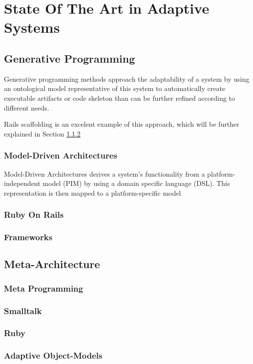 \chapter{State Of The Art in Adaptive Systems}\label{chap:sota}

\section{Generative Programming}\label{sec:generative_programming}

Generative programming methods approach the adaptability of a system by using an ontological model representative of this system to automatically create executable artifacts or code skeleton than can be further refined according to different needs.

Rails scaffolding is an excelent example of this approach, which will be further explained in Section \ref{sec:ror}

\subsection{Model-Driven Architectures}\label{sec:mda}

Model-Driven Architectures derives a system's functionality from a platform-independent model (PIM) by using a domain specific language (DSL). This representation is then mapped to a platform-specific model

\subsection{Ruby On Rails}\label{sec:ror}

\subsection{Frameworks}\label{sec:frameworks}


\section{Meta-Architecture}\label{sec:meta-architecture}

\subsection{Meta Programming}\label{sec:metaprogramming}

\subsection{Smalltalk}\label{sec:smalltalk}

\subsection{Ruby}\label{sec:ruby}

\subsection{Adaptive Object-Models}\label{sec:aom}

